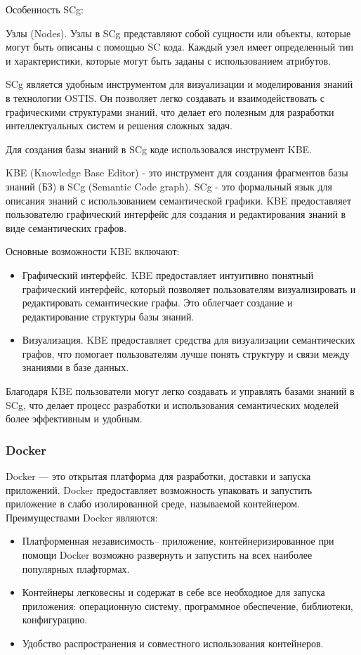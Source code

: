 Особенность SCg:

Узлы (Nodes). Узлы в SCg представляют собой сущности или объекты, которые могут быть описаны с помощью SC кода. Каждый узел имеет определенный тип и характеристики, которые могут быть заданы с использованием атрибутов.

SCg является удобным инструментом для визуализации и моделирования знаний в технологии OSTIS. Он позволяет легко создавать и взаимодействовать с графическими структурами знаний, что делает его полезным для разработки интеллектуальных систем и решения сложных задач.

Для создания базы знаний в SCg коде использовался инструмент KBE.

KBE (Knowledge Base Editor) - это инструмент для создания фрагментов базы знаний (БЗ) в SCg (Semantic Code graph). SCg - это формальный язык для описания знаний с использованием семантической графики. KBE предоставляет пользователю графический интерфейс для создания и редактирования знаний в виде семантических графов.

Основные возможности KBE включают:
\begin{itemize}
    \item Графический интерфейс. KBE предоставляет интуитивно понятный графический интерфейс, который позволяет пользователям визуализировать и редактировать семантические графы. Это облегчает создание и редактирование структуры базы знаний.
    \item Визуализация. KBE предоставляет средства для визуализации семантических графов, что помогает пользователям лучше понять структуру и связи между знаниями в базе данных.
\end{itemize}

Благодаря KBE пользователи могут легко создавать и управлять базами знаний в SCg, что делает процесс разработки и использования семантических моделей более эффективным и удобным.

\subsubsection{Docker}

Docker — это открытая платформа для разработки, доставки и запуска приложений. Docker предоставляет возможность упаковать и запустить приложение в слабо изолированной среде, называемой контейнером. Преимуществами Docker являются:
\begin{itemize}
    \item Платформенная независимость– приложение, контейнеризированное при помощи Docker возможно развернуть и запустить на всех наиболее популярных плафтормах.
    \item Контейнеры легковесны и содержат в себе все необходиое для запуска приложения: операционную систему, программное обеспечение, библиотеки, конфигурацию.
    \item Удобство распространения и совместного использования контейнеров.
\end{itemize}


